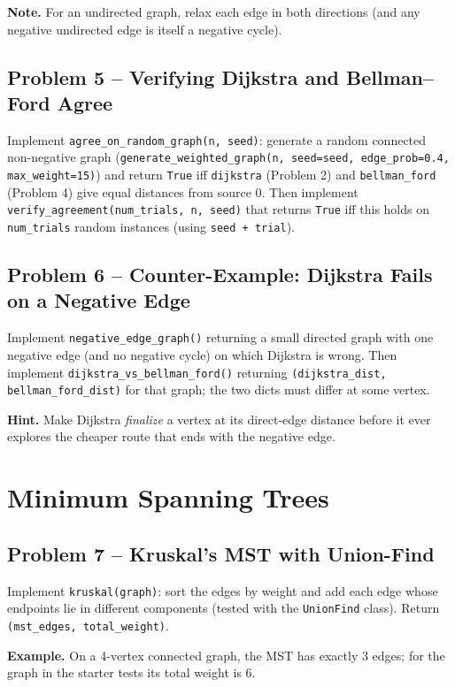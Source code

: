 \documentclass[11pt]{article}
\begin{document}
\textbf{Note.} For an undirected graph, relax each edge in both directions (and any
negative undirected edge is itself a negative cycle).

\subsection*{Problem 5 -- Verifying Dijkstra and Bellman--Ford Agree}

Implement \texttt{agree\_on\_random\_graph(n, seed)}: generate a random connected
non-negative graph (\texttt{generate\_weighted\_graph(n, seed=seed, edge\_prob=0.4,
max\_weight=15)}) and return \texttt{True} iff \texttt{dijkstra} (Problem 2) and
\texttt{bellman\_ford} (Problem 4) give equal distances from source 0. Then implement
\texttt{verify\_agreement(num\_trials, n, seed)} that returns \texttt{True} iff this holds
on \texttt{num\_trials} random instances (using \texttt{seed + trial}).

\subsection*{Problem 6 -- Counter-Example: Dijkstra Fails on a Negative Edge}

Implement \texttt{negative\_edge\_graph()} returning a small directed graph with one
negative edge (and no negative cycle) on which Dijkstra is wrong. Then implement
\texttt{dijkstra\_vs\_bellman\_ford()} returning \texttt{(dijkstra\_dist,
bellman\_ford\_dist)} for that graph; the two dicts must differ at some vertex.

\textbf{Hint.} Make Dijkstra \emph{finalize} a vertex at its direct-edge distance before
it ever explores the cheaper route that ends with the negative edge.

\newpage
\section{Minimum Spanning Trees}

\subsection*{Problem 7 -- Kruskal's MST with Union-Find}

Implement \texttt{kruskal(graph)}: sort the edges by weight and add each edge whose
endpoints lie in different components (tested with the \texttt{UnionFind} class). Return
\texttt{(mst\_edges, total\_weight)}.

\textbf{Example.} On a 4-vertex connected graph, the MST has exactly 3 edges; for the
graph in the starter tests its total weight is 6.
\end{document}
